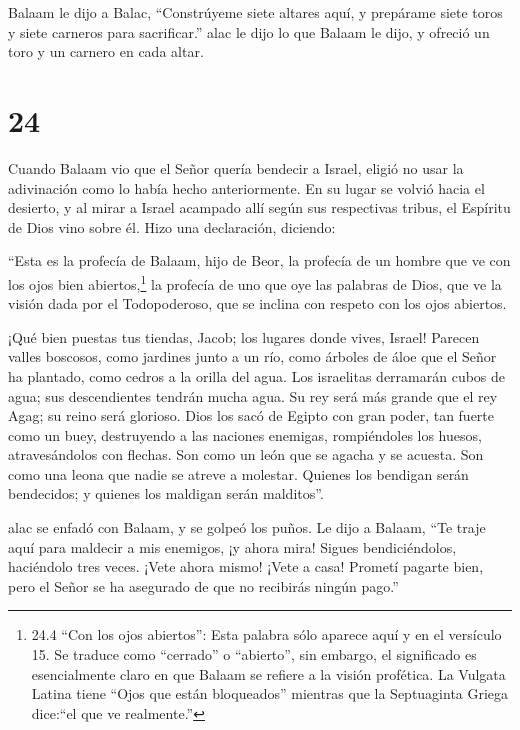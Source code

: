 Balaam le dijo a Balac, ``Constrúyeme siete altares aquí,
y prepárame siete toros y siete carneros para sacrificar.''
 alac le dijo lo que Balaam le dijo, y ofreció un toro y un
carnero en cada altar.

\hypertarget{section-23}{%
\section{24}\label{section-23}}

 Cuando Balaam vio que el Señor quería bendecir a Israel,
eligió no usar la adivinación como lo había hecho anteriormente. En su
lugar se volvió hacia el desierto,  y al mirar a Israel
acampado allí según sus respectivas tribus, el Espíritu de Dios vino
sobre él.  Hizo una declaración, diciendo:

 ``Esta es la profecía de Balaam, hijo de Beor, la profecía
de un hombre que ve con los ojos bien abiertos,\footnote{24.4 ``Con los
  ojos abiertos'': Esta palabra sólo aparece aquí y en el versículo 15.
  Se traduce como ``cerrado'' o ``abierto'', sin embargo, el significado
  es esencialmente claro en que Balaam se refiere a la visión profética.
  La Vulgata Latina tiene ``Ojos que están bloqueados'' mientras que la
  Septuaginta Griega dice:``el que ve realmente.''} la profecía de uno
que oye las palabras de Dios, que ve la visión dada por el Todopoderoso,
que se inclina con respeto con los ojos abiertos.

 ¡Qué bien puestas tus tiendas, Jacob; los lugares donde
vives, Israel!  Parecen valles boscosos, como jardines junto
a un río, como árboles de áloe que el Señor ha plantado, como cedros a
la orilla del agua.  Los israelitas derramarán cubos de
agua; sus descendientes tendrán mucha agua. Su rey será más grande que
el rey Agag; su reino será glorioso.  Dios los sacó de
Egipto con gran poder, tan fuerte como un buey, destruyendo a las
naciones enemigas, rompiéndoles los huesos, atravesándolos con flechas.
 Son como un león que se agacha y se acuesta. Son como una
leona que nadie se atreve a molestar. Quienes los bendigan serán
bendecidos; y quienes los maldigan serán malditos''.

 alac se enfadó con Balaam, y se golpeó los puños. Le dijo
a Balaam, ``Te traje aquí para maldecir a mis enemigos, ¡y ahora mira!
Sigues bendiciéndolos, haciéndolo tres veces.  ¡Vete ahora
mismo! ¡Vete a casa! Prometí pagarte bien, pero el Señor se ha asegurado
de que no recibirás ningún pago.''

